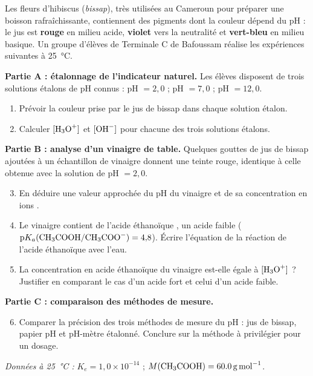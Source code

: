\documentclass[11pt]{article}
\begin{document}
\begin{exercice}
Les fleurs d'hibiscus (\emph{bissap}), très utilisées au Cameroun pour préparer une boisson rafraîchissante, contiennent des pigments dont la couleur dépend du pH : le jus est \textbf{rouge} en milieu acide, \textbf{violet} vers la neutralité et \textbf{vert-bleu} en milieu basique. Un groupe d'élèves de Terminale C de Bafoussam réalise les expériences suivantes à \SI{25}{\celsius}.

\textbf{Partie A : étalonnage de l'indicateur naturel.} Les élèves disposent de trois solutions étalons de pH connus : pH $= 2{,}0$ ; pH $= 7{,}0$ ; pH $= 12{,}0$.
\begin{enumerate}
\item Prévoir la couleur prise par le jus de bissap dans chaque solution étalon.
\item Calculer $[\ce{H3O+}]$ et $[\ce{OH-}]$ pour chacune des trois solutions étalons.
\end{enumerate}

\textbf{Partie B : analyse d'un vinaigre de table.} Quelques gouttes de jus de bissap ajoutées à un échantillon de vinaigre donnent une teinte rouge, identique à celle obtenue avec la solution de pH $= 2{,}0$.
\begin{enumerate}
\setcounter{enumi}{2}
\item En déduire une valeur approchée du pH du vinaigre et de sa concentration en ions .
\item Le vinaigre contient de l'acide éthanoïque , un acide faible ($\text{p}K_a(\ce{CH3COOH}/\ce{CH3COO-}) = 4{,}8$). Écrire l'équation de la réaction de l'acide éthanoïque avec l'eau.
\item La concentration en acide éthanoïque du vinaigre est-elle égale à $[\ce{H3O+}]$ ? Justifier en comparant le cas d'un acide fort et celui d'un acide faible.
\end{enumerate}

\textbf{Partie C : comparaison des méthodes de mesure.}
\begin{enumerate}
\setcounter{enumi}{5}
\item Comparer la précision des trois méthodes de mesure du pH : jus de bissap, papier pH et pH-mètre étalonné. Conclure sur la méthode à privilégier pour un dosage.
\end{enumerate}
\emph{Données à \SI{25}{\celsius} :} $K_e = 1{,}0 \times 10^{-14}$ ; $M(\ce{CH3COOH}) = \SI{60,0}{g.mol^{-1}}$.
\end{exercice}
\end{document}
